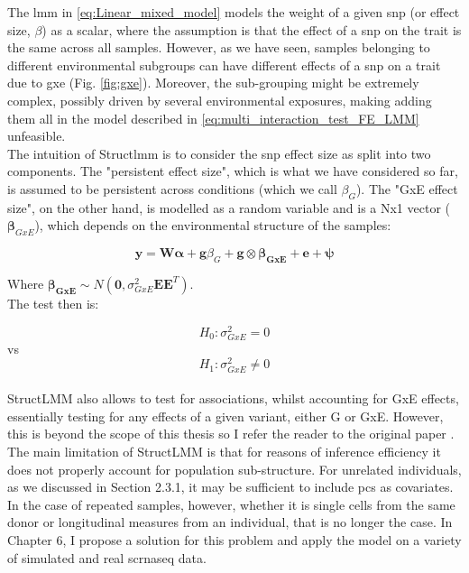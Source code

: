 The \gls{lmm} in \eqref{eq:Linear_mixed_model} models the weight of a given \gls{snp} (or effect size, $\beta$) as a scalar, where the assumption is that the effect of a \gls{snp} on the trait is the same across all samples.
However, as we have seen, samples belonging to different environmental subgroups can have different effects of a \gls{snp} on a trait due to \gls{gxe} (Fig. \ref{fig:gxe}).
Moreover, the sub-grouping might be extremely complex, possibly driven by several environmental exposures, making adding them all in the model described in \eqref{eq:multi_interaction_test_FE_LMM} unfeasible.\\

The intuition of Struct\gls{lmm} is to consider the \gls{snp} effect size as split into two components.
The "persistent effect size", which is what we have considered so far, is assumed to be persistent across conditions (which we call $\beta_G$). 
The "GxE effect size", on the other hand, is modelled as a random variable and is a Nx1 vector ($\boldsymbol{\beta}_{GxE}$), which depends on the environmental structure of the samples:

\begin{equation}\label{eq:StructLMM-int}
 \mathbf{y} =  \mathbf{W}\boldsymbol{\alpha} + \mathbf{g}\beta_G + \mathbf{g} \otimes \boldsymbol{\beta_{GxE}} + \mathbf{e} + \boldsymbol{\psi} 
\end{equation}

Where $\boldsymbol{\beta_{GxE}} \sim N(\mathbf{0}, \sigma^2_{GxE}\mathbf{E}\mathbf{E}^T)$.\\

The test then is:

\begin{equation}
 H_{0}: \sigma^2_{GxE}=0 
\end{equation}
vs
\begin{equation}
 H_{1}: \sigma^2_{GxE} \neq 0 
\end{equation}\\

StructLMM also allows to test for associations, whilst accounting for GxE effects, essentially testing for any effects of a given variant, either G or GxE.
However, this is beyond the scope of this thesis so I refer the reader to the original paper \cite{moore2019linear}.\\

The main limitation of StructLMM is that for reasons of inference efficiency it does not properly account for population sub-structure.
For unrelated individuals, as we discussed in Section 2.3.1, it may be sufficient to include \gls{pc}s as covariates.
In the case of repeated samples, however, whether it is single cells from the same donor or longitudinal measures from an individual, that is no longer the case.
In Chapter 6, I propose a solution for this problem and apply the model on a variety of simulated and real \gls{scrnaseq} data.


